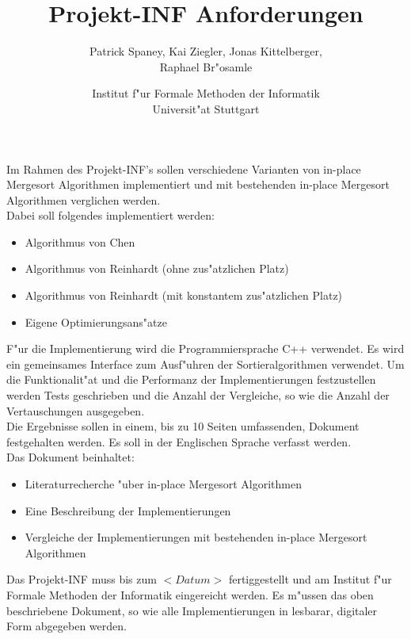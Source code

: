 \documentclass[12pt,pdftex,a4paper]{article}
\begin{document}
\title{Projekt-INF Anforderungen}
\author{Patrick Spaney, Kai Ziegler, Jonas Kittelberger, \\ Raphael Br"osamle}
\date{Institut f"ur Formale Methoden der Informatik \\ Universit"at Stuttgart}
\maketitle
Im Rahmen des Projekt-INF's sollen verschiedene Varianten von in-place Mergesort Algorithmen implementiert und mit bestehenden in-place Mergesort Algorithmen verglichen werden. \\
Dabei soll folgendes implementiert werden:
\begin{itemize}
\item Algorithmus von Chen
\item Algorithmus von Reinhardt (ohne zus"atzlichen Platz)
\item Algorithmus von Reinhardt (mit konstantem zus"atzlichen Platz)
\item Eigene Optimierungsans"atze
\end{itemize}
F"ur die Implementierung wird die Programmiersprache C++ verwendet. Es wird ein gemeinsames Interface zum Ausf"uhren der Sortieralgorithmen verwendet. Um die Funktionalit"at und die Performanz der Implementierungen festzustellen werden Tests geschrieben und die Anzahl der Vergleiche, so wie die Anzahl der Vertauschungen ausgegeben.\\
Die Ergebnisse sollen in einem, bis zu 10 Seiten umfassenden, Dokument festgehalten werden. Es soll in der Englischen Sprache verfasst werden.  \\
Das Dokument beinhaltet: 
\begin{itemize}
\item Literaturrecherche "uber in-place Mergesort Algorithmen
\item Eine Beschreibung der Implementierungen
\item Vergleiche der Implementierungen mit bestehenden in-place Mergesort Algorithmen
\end{itemize}
Das Projekt-INF muss bis zum $<Datum>$ fertiggestellt und am Institut f"ur Formale Methoden der Informatik eingereicht werden. Es m"ussen das oben beschriebene Dokument, so wie alle Implementierungen in lesbarar, digitaler Form abgegeben werden.
\end{document}
